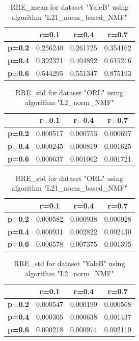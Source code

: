 \begin{table}[h]
\centering
\begin{tabular}{|c|c|c|c|}
\hline
\textbf{}      & \textbf{r=0.1} & \textbf{r=0.4} & \textbf{r=0.7} \\ \hline
\textbf{p=0.2} & 0.256240       & 0.261725       & 0.354162       \\ \hline
\textbf{p=0.4} & 0.392321       & 0.404892       & 0.615216       \\ \hline
\textbf{p=0.6} & 0.544295       & 0.551347       & 0.875193       \\ \hline
\end{tabular}
\caption{RRE\_mean for dataset "YaleB" using algorithm "L21\_norm\_based\_NMF"}
\end{table}

\begin{table}[h]
\centering
\begin{tabular}{|c|c|c|c|}
\hline
\textbf{}      & \textbf{r=0.1} & \textbf{r=0.4} & \textbf{r=0.7} \\ \hline
\textbf{p=0.2} & 0.000517       & 0.000753       & 0.000697       \\ \hline
\textbf{p=0.4} & 0.000245       & 0.000819       & 0.001625       \\ \hline
\textbf{p=0.6} & 0.000637       & 0.001062       & 0.001721       \\ \hline
\end{tabular}
\caption{RRE\_std for dataset "ORL" using algorithm "L2\_norm\_NMF"}
\end{table}

\begin{table}[h]
\centering
\begin{tabular}{|c|c|c|c|}
\hline
\textbf{}      & \textbf{r=0.1} & \textbf{r=0.4} & \textbf{r=0.7} \\ \hline
\textbf{p=0.2} & 0.000582       & 0.000938       & 0.000928       \\ \hline
\textbf{p=0.4} & 0.000931       & 0.002822       & 0.002430       \\ \hline
\textbf{p=0.6} & 0.006578       & 0.007375       & 0.001395       \\ \hline
\end{tabular}
\caption{RRE\_std for dataset "ORL" using algorithm "L21\_norm\_based\_NMF"}
\end{table}

\begin{table}[h]
\centering
\begin{tabular}{|c|c|c|c|}
\hline
\textbf{}      & \textbf{r=0.1} & \textbf{r=0.4} & \textbf{r=0.7} \\ \hline
\textbf{p=0.2} & 0.000547       & 0.000199       & 0.000568       \\ \hline
\textbf{p=0.4} & 0.000305       & 0.000638       & 0.001437       \\ \hline
\textbf{p=0.6} & 0.000218       & 0.000974       & 0.002119       \\ \hline
\end{tabular}
\caption{RRE\_std for dataset "YaleB" using algorithm "L2\_norm\_NMF"}
\end{table}

